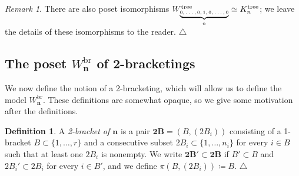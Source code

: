 \documentclass[11pt]{amsart}
\theoremstyle{definition}
\newtheorem{definition}[theorem]{Definition}
\theoremstyle{remark}
\newtheorem{remark}[theorem]{Remark}
\theoremstyle{plain}
\newcommand\bn{\mathbf{n}}
\newcommand{\btB}{{\mathbf{2B}}}
\newcommand{\on}{\operatorname}
\newcommand{\tree}{{\on{tree}}}
\newcommand{\br}{{\on{br}}}
\begin{document}
\begin{remark}
There are also poset isomorphisms $W^\tree_{\tiny \underbrace{0,\ldots,0,1,0,\ldots,0}_n} \simeq K^\tree_n$; we leave the details of these isomorphisms to the reader.
\null\hfill$\triangle$
\end{remark}

\subsection{The poset \texorpdfstring{$W_\bn^\br$}{Wnbr} of 2-bracketings}
\label{ss:Wnbr_construction}

We now define the notion of a 2-bracketing, which will allow us to define the model $W_\bn^\br$.
These definitions are somewhat opaque, so we give some motivation after the definitions.

\begin{definition}
\label{def:2bracket}
A \emph{2-bracket of $\bn$} is a pair $\btB = (B, (2B_i))$\label{p:btB} consisting of a 1-bracket $B \subset \{1,\ldots,r\}$ and a consecutive subset $2B_i \subset \{1,\ldots,n_i\}$ for every $i \in B$ such that at least one $2B_i$ is nonempty.
We write $\btB' \subset \btB$ if $B' \subset B$ and $2B_i' \subset 2B_i$ for every $i \in B'$, and we define $\pi(B,(2B_i)) \coloneqq B$.
\null\hfill$\triangle$
\end{definition}
\end{document}
